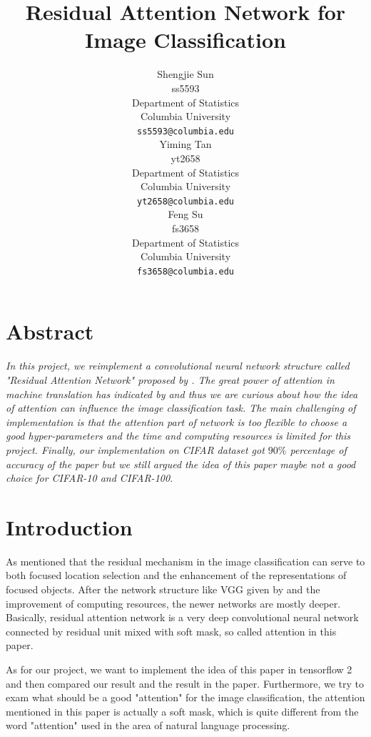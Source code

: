 \documentclass{article}
\title{Residual Attention Network for Image Classification}
\author{%
  Shengjie Sun \\
  ss5593\\
  Department of Statistics\\
  Columbia University\\
  \texttt{ss5593@columbia.edu} \\
  \And
  Yiming Tan \\
  yt2658 \\
  Department of Statistics\\
  Columbia University\\
  \texttt{yt2658@columbia.edu} \\
  \And
  Feng Su \\
  fs3658 \\
  Department of Statistics\\
  Columbia University\\
  \texttt{fs3658@columbia.edu}
}
\begin{document}
\maketitle

\begin{multicols}{2}
\section*{Abstract}
\textit{In this project, we reimplement a convolutional neural network structure called "Residual Attention Network" proposed by \citet{wang2017residual}. The great power of attention in machine translation has indicated by \citet{vaswani2017attention} and thus we are curious about how the idea of attention can influence the image classification task. The main challenging of implementation is that the attention part of network is too flexible to choose a good hyper-parameters and the time and computing resources is limited for this project. Finally, our implementation on CIFAR dataset got $90\%$ percentage of accuracy of the paper but we still argued the idea of this paper maybe not a good choice for CIFAR-10 and CIFAR-100.}





\section{Introduction}
As \citet{wang2017residual} mentioned that the residual mechanism in the image classification can serve to both focused location selection and the enhancement of the representations of focused objects. After the network structure like VGG given by \cite{simonyan2014very} and the improvement of computing resources, the newer networks are mostly deeper. Basically, residual attention network is a very deep convolutional neural network connected by residual unit mixed with soft mask, so called attention in this paper. 

As for our project, we want to implement the idea of this paper in tensorflow 2 and then compared our result and the result in the paper. Furthermore, we try to exam what should be a good "attention" for the image classification, the attention mentioned in this paper is actually a soft mask, which is quite different from the word "attention" used in the area of natural language processing. 
\end{multicols}
\end{document}
